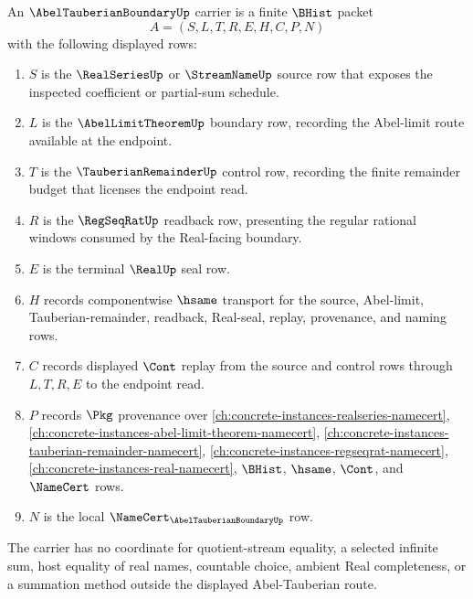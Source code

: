 \begin{definition}
\label{def:abel-tauberian-boundary-carrier}
An $\AbelTauberianBoundaryUp$ carrier is a finite $\BHist$ packet
$$
A=(S,L,T,R,E,H,C,P,N)
$$
with the following displayed rows:
\begin{enumerate}
\item $S$ is the $\RealSeriesUp$ or $\StreamNameUp$ source row that exposes the inspected coefficient or partial-sum schedule.
\item $L$ is the $\AbelLimitTheoremUp$ boundary row, recording the Abel-limit route available at the endpoint.
\item $T$ is the $\TauberianRemainderUp$ control row, recording the finite remainder budget that licenses the endpoint read.
\item $R$ is the $\RegSeqRatUp$ readback row, presenting the regular rational windows consumed by the Real-facing boundary.
\item $E$ is the terminal $\RealUp$ seal row.
\item $H$ records componentwise $\hsame$ transport for the source, Abel-limit, Tauberian-remainder, readback, Real-seal, replay, provenance, and naming rows.
\item $C$ records displayed $\Cont$ replay from the source and control rows through $L,T,R,E$ to the endpoint read.
\item $P$ records $\Pkg$ provenance over \autoref{ch:concrete-instances-realseries-namecert}, \autoref{ch:concrete-instances-abel-limit-theorem-namecert}, \autoref{ch:concrete-instances-tauberian-remainder-namecert}, \autoref{ch:concrete-instances-regseqrat-namecert}, \autoref{ch:concrete-instances-real-namecert}, $\BHist$, $\hsame$, $\Cont$, and $\NameCert$ rows.
\item $N$ is the local $\NameCert_{\AbelTauberianBoundaryUp}$ row.
\end{enumerate}
The carrier has no coordinate for quotient-stream equality, a selected infinite sum, host equality of real names, countable choice, ambient Real completeness, or a summation method outside the displayed Abel-Tauberian route.
\end{definition}

